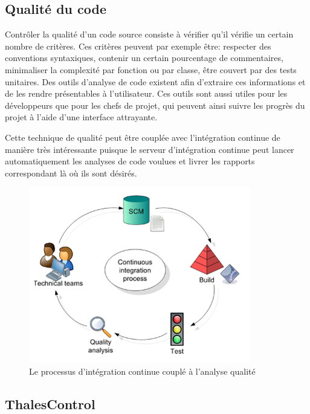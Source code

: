 \subsection{Qualité du code}

Contrôler la qualité d'un code source consiste à vérifier qu'il vérifie un 
certain nombre de critères. Ces critères peuvent par exemple être: respecter des
conventions syntaxiques, contenir un certain pourcentage de commentaires, 
minimaliser la complexité par fonction ou par classe, être couvert par des tests
unitaires. Des outils d'analyse de code existent afin d'extraire ces 
informations et de les rendre présentables à l'utilisateur. Ces outils sont 
aussi utiles pour les développeurs que pour les chefs de projet, qui peuvent 
ainsi suivre les progrès du projet à l'aide d'une interface attrayante.

Cette technique de qualité peut être couplée avec l'intégration continue de 
manière très intéressante puisque le serveur d'intégration continue peut 
lancer automatiquement les analyses de code voulues et livrer les rapports 
correspondant là où ils sont désirés.

\begin{figure}[htb]
	\centering
	\includegraphics{continuous_integration.png}
	\caption{Le processus d'intégration continue couplé à l'analyse qualité}
\end{figure}

\subsection{ThalesControl}
\label{ThalesControl}

